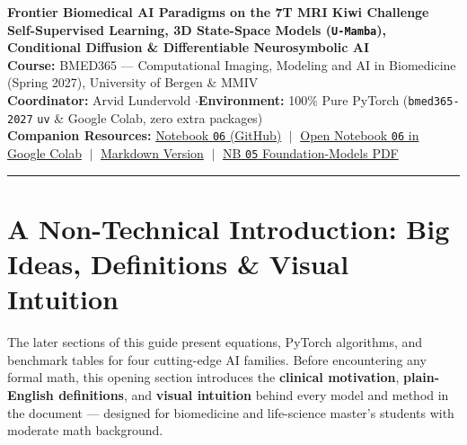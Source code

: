 \documentclass[10.5pt,a4paper]{article}
\begin{document}
\begin{tcolorbox}[enhanced, colback=uibblue!6, colframe=uibblue, boxrule=1.0pt, arc=3pt, left=10pt, right=10pt, top=9pt, bottom=9pt]
{\LARGE\bfseries\color{uibblue} Frontier Biomedical AI Paradigms on the 7T MRI Kiwi Challenge}\\[4pt]
{\normalsize\bfseries Self-Supervised Learning, 3D State-Space Models (\texttt{U-Mamba}), Conditional Diffusion \& Differentiable Neurosymbolic AI}\\[3pt]
{\small \textbf{Course:} BMED365 --- Computational Imaging, Modeling and AI in Biomedicine (Spring 2027), University of Bergen \& MMIV\\
\textbf{Coordinator:} Arvid Lundervold \quad$\cdot$\quad \textbf{Environment:} 100\% Pure PyTorch (\texttt{bmed365-2027} \texttt{uv} \& Google Colab, zero extra packages)\\[3pt]
\textbf{Companion Resources:} \href{https://github.com/arvidl/BMED365-2027/blob/main/Lab4-Comp-Imag/Kiwi-challenge/notebooks/06-kiwi-frontier-ai-paradigms.ipynb}{Notebook \texttt{06} (GitHub)} $\;\vert\;$ \href{https://colab.research.google.com/github/arvidl/BMED365-2027/blob/main/Lab4-Comp-Imag/Kiwi-challenge/notebooks/06-kiwi-frontier-ai-paradigms.ipynb}{Open Notebook \texttt{06} in Google Colab} $\;\vert\;$ \href{https://github.com/arvidl/BMED365-2027/blob/main/Lab4-Comp-Imag/Kiwi-challenge/docs/frontier-ai-paradigms.md}{Markdown Version} $\;\vert\;$ \href{https://github.com/arvidl/BMED365-2027/blob/main/Lab4-Comp-Imag/Kiwi-challenge/docs/promptable-foundation-models.pdf}{NB \texttt{05} Foundation-Models PDF}}
\end{tcolorbox}

\vspace{-2pt}
{\small\tableofcontents}
\vspace{4pt}
\hrule
\vspace{6pt}

\section{A Non-Technical Introduction: Big Ideas, Definitions \& Visual Intuition}

\begin{infobox}
The later sections of this guide present equations, PyTorch algorithms, and benchmark tables for four cutting-edge AI families. Before encountering any formal math, this opening section introduces the \textbf{clinical motivation}, \textbf{plain-English definitions}, and \textbf{visual intuition} behind every model and method in the document --- designed for biomedicine and life-science master's students with moderate math background.
\end{infobox}
\end{document}
